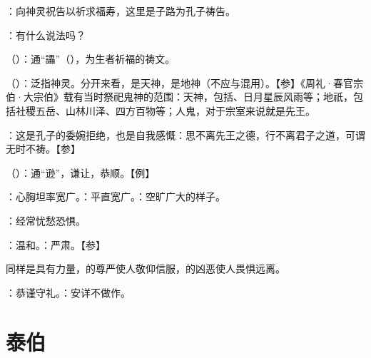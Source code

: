 {
\item {}：向神灵祝告以祈求福寿，这里是子路为孔子祷告。
\item {}：有什么说法吗？
\item {}（）：通“讄”（），为生者祈福的祷文。
\item {}（）：泛指神灵。分开来看，是天神，是地神（不应与混用）。【参】《周礼·春官宗伯·大宗伯》载有当时祭祀鬼神的范围：天神，包括、日月星辰风雨等；地祇，包括社稷五岳、山林川泽、四方百物等；人鬼，对于宗室来说就是先王。
\item {}：这是孔子的委婉拒绝，也是自我感慨：思不离先王之德，行不离君子之道，可谓无时不祷。【参】
}
{}


{
\item {}（）：通“逊”，谦让，恭顺。【例】 
}
{}  %


{
\item {}：心胸坦率宽广。：平直宽广。：空旷广大的样子。%
\item {}：经常忧愁恐惧。
}
{}


{
\item {}：温和。：严肃。【参】
\item 同样是具有力量，的尊严使人敬仰信服，的凶恶使人畏惧远离。
\item {}：恭谨守礼。：安详不做作。
}
{}



\chapter{泰伯}

